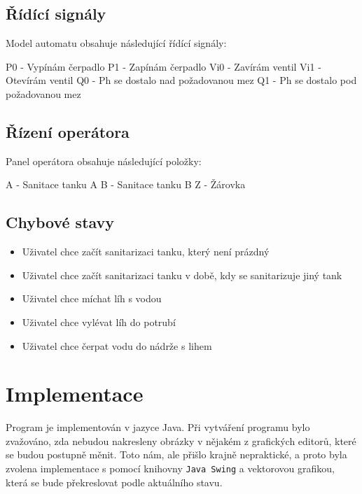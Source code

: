 \documentclass[12pt, a4paper]{article}
\begin{document}
\subsection{Řídící signály}
Model automatu obsahuje následující řídící signály:

P0 - Vypínám čerpadlo \newline 
P1 - Zapínám čerpadlo \newline 
Vi0 - Zavírám ventil \newline 
Vi1 - Otevírám ventil \newline 
Q0 - Ph se dostalo nad požadovanou mez \newline 
Q1 - Ph se dostalo pod požadovanou mez 

\newpage
\subsection{Řízení operátora}
Panel operátora obsahuje následující položky:

A - Sanitace tanku A \newline 
B - Sanitace tanku B \newline 
Z - Žárovka

\subsection{Chybové stavy} \label{chyba}
\begin{itemize}
  \item Uživatel chce začít sanitarizaci tanku, který není prázdný
  \item Uživatel chce začít sanitarizaci tanku v době, kdy se sanitarizuje jiný tank
  \item Uživatel chce míchat líh s vodou
  \item Uživatel chce vylévat líh do potrubí
  \item Uživatel chce čerpat vodu do nádrže s lihem
\end{itemize}

\section{Implementace}
Program je implementován v jazyce Java. Při vytváření programu bylo zvažováno, zda nebudou nakresleny obrázky v nějakém z grafických editorů, které se budou postupně měnit. Toto nám, ale přišlo krajně nepraktické, a proto byla zvolena implementace s pomocí knihovny \texttt{Java Swing} a vektorovou grafikou, která se bude překreslovat podle aktuálního stavu. 
\end{document}
